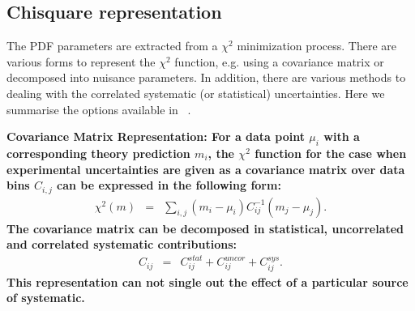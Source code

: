 \subsection{Chisquare representation}
\label{sec:chi2representation}

The PDF parameters are extracted from a $\chi^2$ minimization process. 
There are various forms to represent the $\chi^2$ function, e.g. using a covariance matrix or decomposed into nuisance parameters. In addition, there are various methods to dealing with the correlated systematic (or statistical) uncertainties. Here we summarise the options available in \fitter\ . 

\begin{description}
\item \bf {Covariance Matrix Representation:} \rm
For a data point  $\mu_i$ with a corresponding theory prediction $m_i$, the $\chi^2$ function for the case when experimental uncertainties are given as a covariance matrix over data bins $C_{i,j}$ can be expressed in the following form:
%
\begin{eqnarray}
\chi^2 (m)& = & \sum_{i,j}(m_i-\mu_i)C^{-1}_{ij}(m_j-\mu_j).
\end{eqnarray}
The covariance matrix can be decomposed in statistical, uncorrelated and correlated systematic contributions: 
\begin{eqnarray}
C_{ij}& = & C^{stat}_{ij}+C^{uncor}_{ij}+C^{sys}_{ij}.
\end{eqnarray}
This representation can not single out the effect of a particular
source of systematic.


\end{description}
